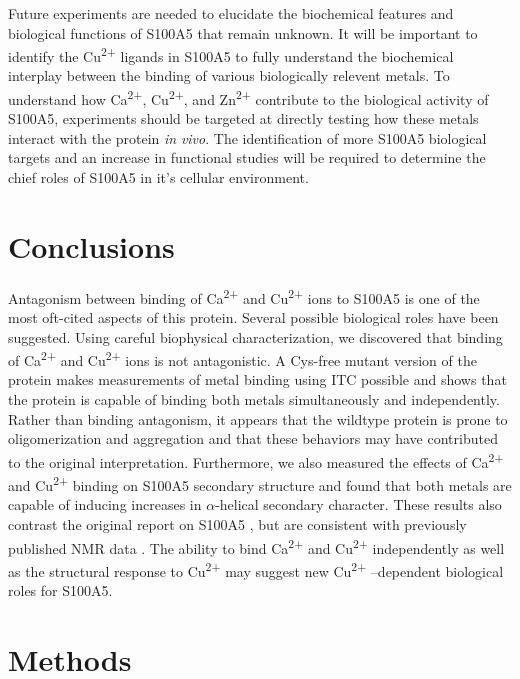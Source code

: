 Future experiments are needed to elucidate the biochemical features
and biological functions of S100A5 that remain unknown. It will be
important to identify the Cu\textsuperscript{2+} ligands in S100A5
to fully understand the biochemical interplay between the binding
of various biologically relevent metals. To understand how Ca\textsuperscript{2+},
Cu\textsuperscript{2+}, and Zn\textsuperscript{2+} contribute to
the biological activity of S100A5, experiments should be targeted
at directly testing how these metals interact with the protein \textit{in}
\textit{vivo}. The identification of more S100A5 biological targets
and an increase in functional studies will be required to determine
the chief roles of S100A5 in it's cellular environment. 


\section{Conclusions}

Antagonism between binding of Ca\textsuperscript{2+} and Cu\textsuperscript{2+} 
ions to S100A5 is one of the most oft-cited aspects of this protein.
Several possible biological roles have been suggested. Using careful
biophysical characterization, we discovered that binding of Ca\textsuperscript{2+} 
and Cu\textsuperscript{2+} ions is not antagonistic. A Cys-free mutant
version of the protein makes measurements of metal binding using ITC
possible and shows that the protein is capable of binding both metals
simultaneously and independently. Rather than binding antagonism,
it appears that the wildtype protein is prone to oligomerization and
aggregation and that these behaviors may have contributed to the original
interpretation. Furthermore, we also measured the effects of Ca\textsuperscript{2+} 
and Cu\textsuperscript{2+} binding on S100A5 secondary structure
and found that both metals are capable of inducing increases in $\alpha$-helical
secondary character. These results also contrast the original report
on S100A5 \cite{schafer_brain_2000}, but are consistent with previously
published NMR data \cite{bertini_solution_2009}. The ability to
bind Ca\textsuperscript{2+} and Cu\textsuperscript{2+} independently
as well as the structural response to Cu\textsuperscript{2+} may
suggest new Cu\textsuperscript{2+} –dependent biological roles for
S100A5.

\section{Methods}

